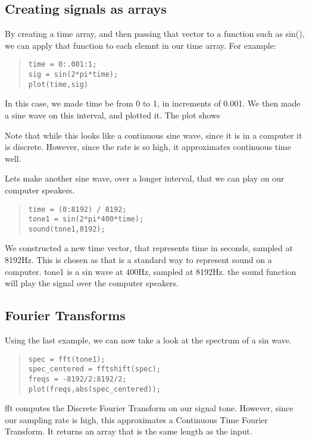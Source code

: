 \documentclass[11pt]{article}
\def\sc{\begin{quote}\begin{lstlisting}}
\def\tt#1{{\ttfamily #1}}
\begin{document}
\subsection{Creating signals as arrays}

By creating a time array, and then passing that vector to a function such as {\ttfamily sin()}, we can apply that function to each elemnt in our time array. For example:
\sc
time = 0:.001:1;
sig = sin(2*pi*time);
plot(time,sig)
\end{lstlisting}
\end{quote}

In this case, we made time be from 0 to 1, in increments of 0.001. We then made a sine wave on this interval, and plotted it. The plot shows


Note that while this looks like a continuous sine wave, since it is in a computer it is discrete. However, since the rate is so high, it approximates continuous time well.

Lets make another sine wave, over a longer interval, that we can play on our computer speakers.
\sc
time = (0:8192) / 8192;
tone1 = sin(2*pi*400*time);
sound(tone1,8192);
\end{lstlisting}
\end{quote}

We constructed a new time vector, that represents time in seconds, sampled at 8192Hz. This is chosen as that is a standard way to represent sound on a computer. \tt{tone1} is a sin wave at 400Hz, sampled at 8192Hz. the \tt{sound} function will play the signal over the computer speakers.

\subsection{Fourier Transforms}

Using the last example, we can now take a look at the spectrum of a sin wave.

\sc
spec = fft(tone1);
spec_centered = fftshift(spec);
freqs = -8192/2:8192/2;
plot(freqs,abs(spec_centered));
\end{lstlisting}
\end{quote}

\tt{fft} computes the Discrete Fourier Transform on our signal \tt{tone}. However, since our sampling rate is high, this approximates a Continuous Time Fourier Transform. It returns an array that is the same length as the input. \\
\end{document}
